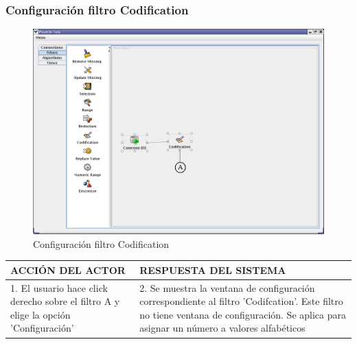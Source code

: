 \newpage
\subsubsection{Configuraci\'on filtro Codification}
\begin{figure}[ht]
\centering
\includegraphics[width=1\textwidth]{images/fi6.png}
\caption{Configuraci\'on filtro Codification}
\end{figure}
\begin{center}
\begin{tabular}{|p{60mm}|p{60mm}|} \hline
ACCI\'ON DEL ACTOR & RESPUESTA DEL SISTEMA \\ \hline
1. El usuario hace click derecho sobre el filtro A y elige la opci\'on 'Configuraci\'on'& 2. Se muestra la ventana de configuraci\'on correspondiente al filtro 'Codifcation'. Este filtro no tiene ventana de configuraci\'on. Se aplica para asignar un n\'umero a valores alfab\'eticos\\ \hline
\end{tabular}
\end{center}

\newpage
